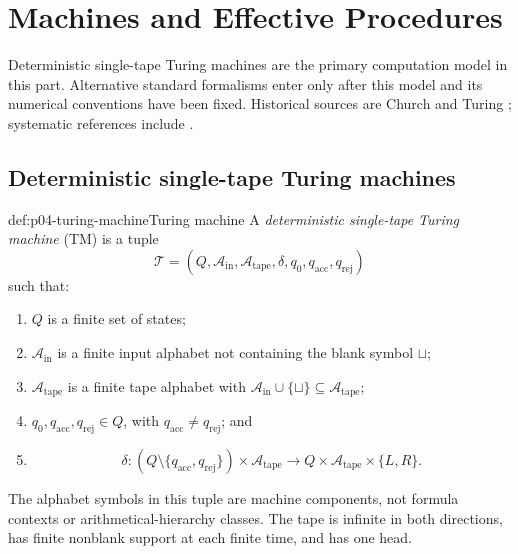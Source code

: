 
\chapter{Machines and Effective Procedures}
\label{sec:p04-machines-effective-procedures}

Deterministic single-tape Turing machines are the primary computation model
in this part.  Alternative standard formalisms enter only after this model and
its numerical conventions have been fixed.  Historical sources are Church
and Turing \cite{Church1936,Turing1937}; systematic references include
\cite{Shoenfield1967,BoolosBurgessJeffrey2007}.

\section{Deterministic single-tape Turing machines}
\label{sec:p04-machines}

\begin{hbdefinition}{def:p04-turing-machine}{Turing machine}
A \emph{deterministic single-tape Turing machine} (TM) is a tuple
\[
  \mathcal T=(Q,\mathcal A_{\mathrm{in}},\mathcal A_{\mathrm{tape}},
  \delta,q_0,q_{\mathrm{acc}},q_{\mathrm{rej}})
\]
such that:
\begin{enumerate}
  \item \(Q\) is a finite set of states;
  \item \(\mathcal A_{\mathrm{in}}\) is a finite input alphabet not
        containing the blank symbol \(\sqcup\);
  \item \(\mathcal A_{\mathrm{tape}}\) is a finite tape alphabet with
        \(\mathcal A_{\mathrm{in}}\cup\{\sqcup\}
        \subseteq\mathcal A_{\mathrm{tape}}\);
  \item \(q_0,q_{\mathrm{acc}},q_{\mathrm{rej}}\in Q\), with
        \(q_{\mathrm{acc}}\ne q_{\mathrm{rej}}\); and
  \item
  \[
    \delta:(Q\setminus\{q_{\mathrm{acc}},q_{\mathrm{rej}}\})
    \times\mathcal A_{\mathrm{tape}}
    \longrightarrow Q\times\mathcal A_{\mathrm{tape}}\times\{L,R\}.
  \]
\end{enumerate}
The alphabet symbols in this tuple are machine components, not formula
contexts or arithmetical-hierarchy classes.  The tape is infinite in both
directions, has finite nonblank support at each finite time, and has one head.
\end{hbdefinition}

